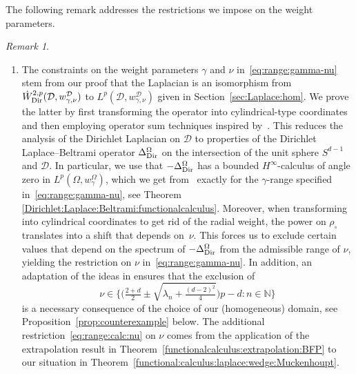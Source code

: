 \documentclass[12pt,a4paper, reqno]{amsart}
\theoremstyle{plain}
\theoremstyle{definition}
\theoremstyle{remark}
\newtheorem{remark}[theorem]{Remark}
\numberwithin{equation}{section}
\newcommand{\1}{\mathbbm{1}}
\newcommand{\N}{\ensuremath{\mathbb{N}}}
\newcommand{\calD}{\ensuremath{\mathcal{D}}}
\newcommand{\Dir}{\textup{Dir}}
\begin{document}
The following remark addresses the restrictions we impose on the weight parameters. 

\begin{remark}\label{rem:main:thm}~
\begin{enumerate}[\textup{(\roman*)}]
\item\label{it:rem:main:range} The constraints on the weight parameters $\gamma$ and $\nu$ in~\eqref{eq:range:gamma-nu} stem from our proof that the Laplacian is an isomorphism from $\Dot{W}^{2,p}_\Dir(\calD,w_{\gamma,\nu}^\calD)$ to $L^p(\calD,w_{\gamma,\nu}^\calD)$ given in Section~\ref{sec:Laplace:hom}.
We prove the latter by first transforming the operator into cylindrical-type  coordinates and then employing operator sum techniques inspired by~\cite{Prss2007HinftycalculusFT}.
This reduces the analysis of the Dirichlet Laplacian on $\calD$ to properties of the Dirichlet Laplace--Beltrami operator $\Delta_\Dir^\Omega$ on the intersection of the unit sphere $S^{d-1}$ and $\calD$.
In particular, we use that $-\Delta_\Dir^{\Omega}$ has a bounded $H^\infty$-calculus of angle zero in $L^p(\Omega,w_\gamma^{\Omega})$, which we get from~\cite{LindemulderVeraar2020} exactly for the $\gamma$-range specified in~\eqref{eq:range:gamma-nu}, see Theorem \ref{Dirichlet:Laplace:Beltrami:functionalcalculus}.
Moreover, when transforming into cylindrical coordinates to get rid of the radial weight, the power on $\rho_\circ$ translates into a shift that depends on~$\nu$.
This forces us to exclude certain values that depend on the spectrum of $-\Delta_\Dir^{\Omega}$ from the admissible range of $\nu$, yielding the restriction on $\nu$ in~\eqref{eq:range:gamma-nu}.
 In addition, an adaptation of the ideas in \cite{KoehneSaalWestermann2021} ensures that the exclusion of 
\[
\nu\in \Big\{\Big(\tfrac{2+d}{2}\pm \sqrt{\lambda_n+\tfrac{(d-2)^2}{4}}\Big)p-d\colon n\in\N\Big\}
\]
is a necessary consequence of the choice of our (homogeneous) domain, see Proposition~\ref{prop:counterexample} below.
The additional restriction~\eqref{eq:range:calc:nu} on $\nu$  comes from the application of the extrapolation result in Theorem~\ref{functionalcalculus:extrapolation:BFP} to our situation in   Theorem~\ref{functional:calculus:laplace:wedge:Muckenhoupt}.


\end{enumerate}
\end{remark}
\end{document}
